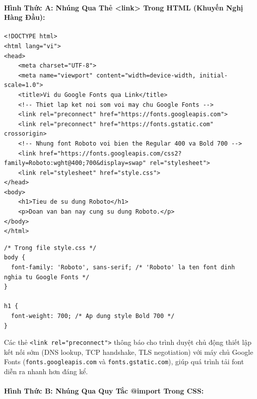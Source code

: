 \documentclass[11pt,oneside]{book}
\newcommand{\codeinline}[1]{\textcolor{accentOrange}{\texttt{#1}}}
\begin{document}
\paragraph{Hình Thức A: Nhúng Qua Thẻ <link> Trong HTML (Khuyến Nghị Hàng Đầu):}

\begin{codeWindow}
\begin{lstlisting}[language=HTML5]
<!DOCTYPE html>
<html lang="vi">
<head>
    <meta charset="UTF-8">
    <meta name="viewport" content="width=device-width, initial-scale=1.0">
    <title>Vi du Google Fonts qua Link</title>
    <!-- Thiet lap ket noi som voi may chu Google Fonts -->
    <link rel="preconnect" href="https://fonts.googleapis.com">
    <link rel="preconnect" href="https://fonts.gstatic.com" crossorigin>
    <!-- Nhung font Roboto voi bien the Regular 400 va Bold 700 -->
    <link href="https://fonts.googleapis.com/css2?family=Roboto:wght@400;700&display=swap" rel="stylesheet">
    <link rel="stylesheet" href="style.css">
</head>
<body>
    <h1>Tieu de su dung Roboto</h1>
    <p>Doan van ban nay cung su dung Roboto.</p>
</body>
</html>
\end{lstlisting}
\end{codeWindow}

\begin{codeWindow}
\begin{lstlisting}[language=CSS3]
/* Trong file style.css */
body {
  font-family: 'Roboto', sans-serif; /* 'Roboto' la ten font dinh nghia tu Google Fonts */
}

h1 {
  font-weight: 700; /* Ap dung style Bold 700 */
}
\end{lstlisting}
\end{codeWindow}

\begin{noteBox}
Các thẻ \codeinline{<link rel="preconnect">} thông báo cho trình duyệt chủ động thiết lập kết nối sớm (DNS lookup, TCP handshake, TLS negotiation) với máy chủ Google Fonts (\codeinline{fonts.googleapis.com} và \codeinline{fonts.gstatic.com}), giúp quá trình tải font diễn ra nhanh hơn đáng kể.
\end{noteBox}

\paragraph{Hình Thức B: Nhúng Qua Quy Tắc @import Trong CSS:}
\end{document}
